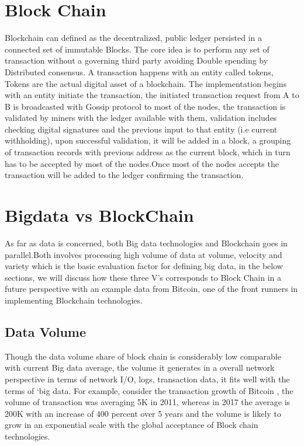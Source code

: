 \documentclass[sigconf]{acmart}
\begin{document}
\section{Block Chain}
Blockchain can defined as the decentralized, public ledger persisted in a connected set of immutable Blocks. The core idea is to perform any set of transaction without a governing third party avoiding Double spending by Distributed consensus. A transaction happens with an entity called tokens, Tokens are the actual digital asset of a blockchain. The implementation begins with an entity initiate the transaction, the initiated transaction request from A to B is broadcasted with Gossip protocol to most of the nodes, the transaction is validated by miners with the ledger available with them, validation includes checking digital signatures and the previous input to that entity (i.e current withholding), upon successful validation, it will be added in a block, a grouping of transaction records with previous address as the current block, which in turn has to be accepted by most of the nodes.Once most of the nodes accepts the transaction  will be added to the ledger confirming the transaction.

\section{Bigdata vs BlockChain}
As far as data is concerned, both Big data technologies and Blockchain goes in parallel.Both involves processing high volume of data at volume, velocity and variety which is the basic evaluation factor for defining big data, in the below sections, we will discuss how these three V's corresponds to Block Chain in a future perspective with an example data from Bitcoin, one of the front runners in implementing Blockchain technologies.

\subsection{Data Volume}
Though the data volume share of block chain is considerably low comparable with current Big data average, the volume it generates in a overall network perspective in terms of network I/O, logs, transaction data, it fits well with the terms of `big data. For example, consider the transaction growth of Bitcoin \cite{bitcointrans}, the volume of transaction was averaging 5K in 2011, whereas in 2017 the average is 200K with an increase of 400 percent over 5 years and the volume is likely to grow in an exponential scale with the global acceptance of Block chain technologies. 
\end{document}
